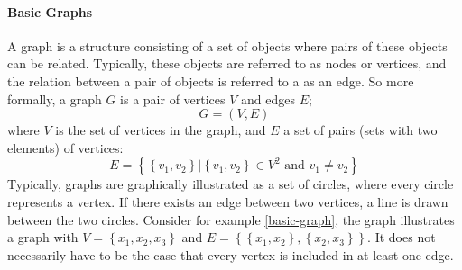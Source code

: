 \paragraph{Basic Graphs}
A graph is a structure consisting of a set of objects where pairs of these objects can be related. Typically, these objects are referred to as nodes or vertices, and the relation between a pair of objects is referred to a as an edge. So more formally, a graph $G$ is a pair of vertices $V$ and edges $E$;
\begin{equation}
	G = (V, E)
\end{equation}
where $V$ is the set of vertices in the graph, and $E$ a set of pairs (sets with two elements) of vertices:
\begin{equation}
	E = \left\{\left\{v_1, v_2\right\} | \left\{v_1, v_2\right\} \in V^2\text{ and } v_1 \neq v_2 \right\}
	\label{undirected-edges}
\end{equation}
Typically, graphs are graphically illustrated as a set of circles, where every circle represents a vertex. If there exists an edge between two vertices, a line is drawn between the two circles. Consider for example \cref{basic-graph}, the graph illustrates a graph with $V = \left\{x_1, x_2, x_3\right\}$ and $E = \left\{\left\{x_1, x_2\right\}, \left\{x_2, x_3\right\}\right\}$. It does not necessarily have to be the case that every vertex is included in at least one edge.

